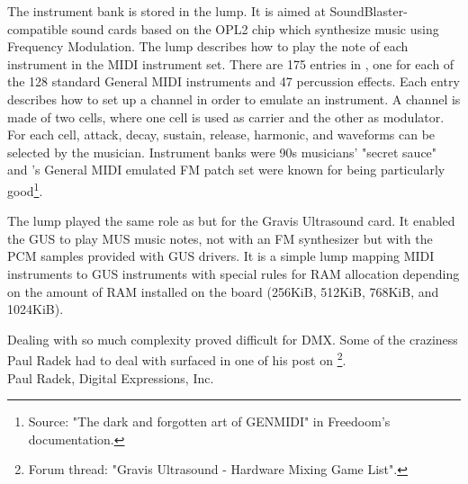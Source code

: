 \par
The instrument bank is stored in the  lump. It is aimed at SoundBlaster-compatible sound cards based on the OPL2 chip which synthesize music using Frequency Modulation. The lump describes how to play the note of each instrument in the MIDI instrument set. There are 175 entries in , one for each of the 128 standard General MIDI instruments and 47 percussion effects. Each entry describes how to set up a channel in order to emulate an instrument. A channel is made of two cells, where one cell is used as carrier and the other as modulator. For each cell, attack, decay, sustain, release, harmonic, and waveforms can be selected by the musician. Instrument banks were 90s musicians' "secret sauce" and \doom's General MIDI emulated FM patch set were known for being particularly good\footnote{Source: "The dark and forgotten art of GENMIDI" in Freedoom's documentation.}.\\
\par
The  lump played the same role as  but for the Gravis Ultrasound card. It enabled the GUS to play MUS music notes, not with an FM synthesizer but with the PCM samples provided with GUS drivers. It is a simple lump mapping MIDI instruments to GUS instruments with special rules for RAM allocation depending on the amount of RAM installed on the board (256KiB, 512KiB, 768KiB, and 1024KiB).\pagebreak



Dealing with so much complexity proved difficult for DMX. Some of the craziness Paul Radek had to deal with surfaced in one of his post on \footnote{Forum thread: "Gravis Ultrasound - Hardware Mixing Game List".}.\\





{Paul Radek, Digital Expressions, Inc.}\\
\par

